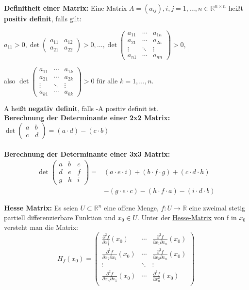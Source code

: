 \documentclass[fontset=ubuntu,12pt,a4paper,fleqn]{article}
\begin{document}
\textbf{Definitheit einer Matrix:} 
Eine Matrix \(A=(a_{ij}), i,j=1,\dots,n \in \mathbb{R}^{n\times n}\) heißt \textbf{positiv definit}, falls gilt:
{\fontsize{9}{10}
\begin{multicols}{2}
\(a_{11}>0,\det\begin{pmatrix}
a_{11} & a_{12} \\ a_{21} & a_{22}
\end{pmatrix} > 0, \dots, \det\begin{pmatrix}
a_{11} & \cdots & a_{1n} \\
a_{21} & \cdots & a_{2n} \\
\vdots & \ddots & \vdots \\
a_{n1} & \cdots & a_{nn}
\end{pmatrix} > 0\), 

also \(\det\begin{pmatrix}
a_{11} & \cdots & a_{1k} \\
a_{21} & \cdots & a_{2k} \\
\vdots & \ddots & \vdots \\
a_{k1} & \cdots & a_{kk}
\end{pmatrix} > 0\) für alle \(k=1,\dots,n\).

A heißt \textbf{negativ definit}, falls -A positiv definit ist.\\
\textbf{Berechnung der Determinante einer 2x2 Matrix:} \\

\(\det\begin{pmatrix}
a & b  \\ c & d
\end{pmatrix}
=  (a\cdot d) - (c\cdot b)\)
\\\\
\textbf{Berechnung der Determinante einer 3x3 Matrix:} 
\begin{align*}
\det\begin{pmatrix}
a & b & c  \\ d & e & f \\ g & h & i
\end{pmatrix}=&(a \cdot e \cdot i) + (b \cdot f \cdot g) + (c \cdot d \cdot h)\\
& - (g \cdot e \cdot c) - (h \cdot f \cdot a) - (i \cdot d \cdot b)
\end{align*}
\end{multicols}
}
\textbf{Hesse Matrix:}
Es seien \(U\subset\mathbb{R}^n\) eine offene Menge, \(f:U\to\mathbb{R}\) eine zweimal stetig partiell differenzierbare Funktion und \(x_0\in U\). Unter der \underline{Hesse-Matrix} von f in \(x_0\) versteht man die Matrix: \[H_f(x_0)=\begin{pmatrix}
\frac{\partial^2 f}{\partial x_1^2}(x_0) & \cdots & \frac{\partial^2 f}{\partial x_1 \partial x_n}(x_0) \\
\frac{\partial^2 f}{\partial x_2 \partial x_1}(x_0) & \cdots & \frac{\partial^2 f}{\partial x_2 \partial x_n}(x_0) \\
\vdots & \ddots & \vdots \\
\frac{\partial^2 f}{\partial x_n \partial x_1}(x_0) & \cdots & \frac{\partial^2 f}{\partial x_n^2}(x_0) \\
\end{pmatrix}\]
\end{document}
